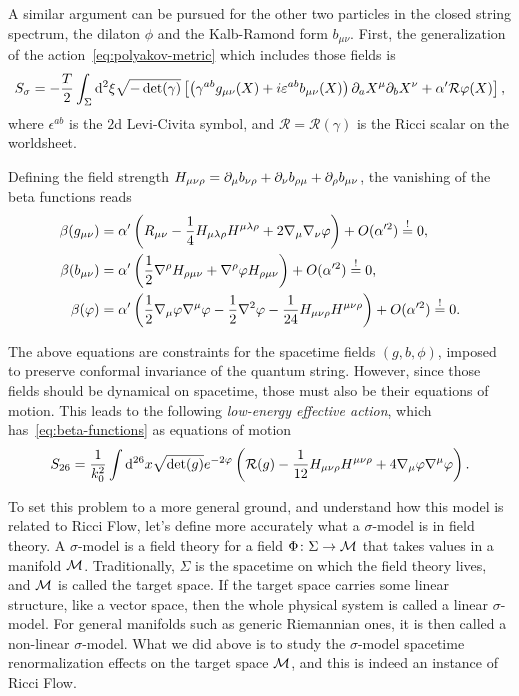 A similar argument can be pursued for the other two particles in the closed string spectrum, the dilaton $\phi$ and the Kalb-Ramond form $b_{\mu\nu}$. First, the generalization of the action~\eqref{eq:polyakov-metric} which includes those fields is
\begin{equation}
    S_\sigma = -\frac{T}{2} \int_\Sigma \mathop{}\!\mathrm{d}^2 \xi \sqrt{-\det(\gamma)}\left[ \left( \gamma^{ab} g_{\mu\nu}(X) + i \varepsilon^{ab} b_{\mu\nu}(X) \right) \partial_a X^\mu \partial_b X^\nu + \alpha' \mathcal{R} \varphi(X) \right],
\end{equation}
where $\epsilon^{ab}$ is the $2$d Levi-Civita symbol, and $\mathcal{R} = \mathcal{R}(\gamma)$ is the Ricci scalar on the worldsheet.

Defining the field strength $H_{\mu\nu\rho} = \partial_\mu b_{\nu\rho} + \partial_\nu b_{\rho\mu} + \partial_\rho b_{\mu\nu}$, the vanishing of the beta functions reads
\begin{subequations}\label{eq:beta-functions}
\begin{align}
    \beta(g_{\mu\nu}) &= \alpha' \left( R_{\mu\nu} - \frac{1}{4} H_{\mu\lambda\rho} H^{\mu\lambda\rho} + 2 \nabla_\mu \nabla_\nu \varphi \right) + O(\alpha'^2)\overset{!}{=} 0,\\
    \beta(b_{\mu\nu}) &= \alpha' \left( \frac{1}{2} \nabla^\rho H_{\rho\mu\nu} + \nabla^\rho \varphi H_{\rho\mu\nu} \right) + O(\alpha'^2)\overset{!}{=} 0, \\
    \beta(\varphi) &= \alpha' \left( \frac{1}{2} \nabla_\mu \varphi \nabla^\mu \varphi - \frac{1}{2} \nabla^2 \varphi - \frac{1}{24} H_{\mu\nu\rho} H^{\mu\nu\rho} \right) + O(\alpha'^2)\overset{!}{=} 0.
\end{align}
\end{subequations}

The above equations are constraints for the spacetime fields $(g,b,\phi)$, imposed to preserve conformal invariance of the quantum string. However, since those fields should be dynamical on spacetime, those must also be their equations of motion. This leads to the following \emph{low-energy effective action}, which has~\eqref{eq:beta-functions} as equations of motion
\begin{equation}
    S_{26} = \frac{1}{k^2_0} \int \mathop{}\!\mathrm{d}^{26}x \sqrt{\det(g)} e^{-2\varphi} \left( \mathcal{R}(g) - \frac{1}{12} H_{\mu\nu\rho} H^{\mu\nu\rho} + 4 \nabla_\mu \varphi \nabla^\mu \varphi \right).
\end{equation}

To set this problem to a more general ground, and understand how this model is related to Ricci Flow, let's define more accurately what a $\sigma$-model is in field theory. A $\sigma$-model is a field theory for a field $\Phi \colon \Sigma \to \mathcal{M}$ that takes values in a manifold $\mathcal{M}$. Traditionally, $\Sigma$ is the spacetime on which the field theory lives, and $\mathcal{M}$ is called the target space. If the target space carries some linear structure, like a vector space, then the whole physical system is called a linear $\sigma$-model. For general manifolds such as generic Riemannian ones, it is then called a non-linear $\sigma$-model. What we did above is to study the $\sigma$-model spacetime renormalization effects on the target space $\mathcal{M}$, and this is indeed an instance of Ricci Flow.